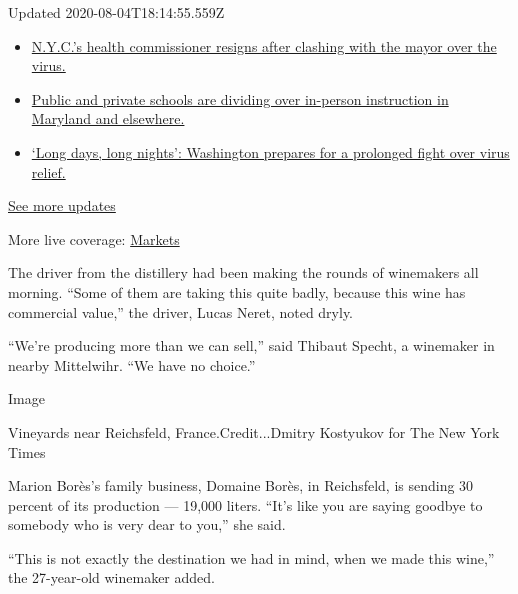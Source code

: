 Updated 2020-08-04T18:14:55.559Z

\begin{itemize}
\tightlist
\item
  \href{https://www.nytimes.com/2020/08/04/world/coronavirus-cases.html?action=click\&pgtype=Article\&state=default\&region=MAIN_CONTENT_1\&context=storylines_live_updates\#link-4d1eafa8}{N.Y.C.'s
  health commissioner resigns after clashing with the mayor over the
  virus.}
\item
  \href{https://www.nytimes.com/2020/08/04/world/coronavirus-cases.html?action=click\&pgtype=Article\&state=default\&region=MAIN_CONTENT_1\&context=storylines_live_updates\#link-18bf040e}{Public
  and private schools are dividing over in-person instruction in
  Maryland and elsewhere.}
\item
  \href{https://www.nytimes.com/2020/08/04/world/coronavirus-cases.html?action=click\&pgtype=Article\&state=default\&region=MAIN_CONTENT_1\&context=storylines_live_updates\#link-6b644638}{`Long
  days, long nights': Washington prepares for a prolonged fight over
  virus relief.}
\end{itemize}

\href{https://www.nytimes.com/2020/08/04/world/coronavirus-cases.html?action=click\&pgtype=Article\&state=default\&region=MAIN_CONTENT_1\&context=storylines_live_updates}{See
more updates}

More live coverage:
\href{https://www.nytimes.com/live/2020/08/04/business/stock-market-today-coronavirus?action=click\&pgtype=Article\&state=default\&region=MAIN_CONTENT_1\&context=storylines_live_updates}{Markets}

The driver from the distillery had been making the rounds of winemakers
all morning. ``Some of them are taking this quite badly, because this
wine has commercial value,'' the driver, Lucas Neret, noted dryly.

``We're producing more than we can sell,'' said Thibaut Specht, a
winemaker in nearby Mittelwihr. ``We have no choice.''

Image

Vineyards near Reichsfeld, France.Credit...Dmitry Kostyukov for The New
York Times

Marion Borès's family business, Domaine Borès, in Reichsfeld, is sending
30 percent of its production --- 19,000 liters. ``It's like you are
saying goodbye to somebody who is very dear to you,'' she said.

``This is not exactly the destination we had in mind, when we made this
wine,'' the 27-year-old winemaker added.


